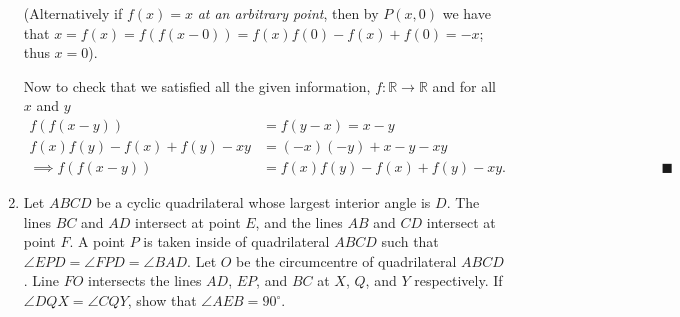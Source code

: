 \documentclass[11pt]{article}
\begin{document}
\begin{enumerate}[topsep=\bigskipamount,itemsep=\bigskipamount,leftmargin=0pt]
(Alternatively if $f(x)=x$ \emph{at an arbitrary point}, then by $P(x,0)$ we have that $x = f(x) = f(f(x-0)) = f(x)f(0) - f(x)+f(0) = -x$; thus $x=0$).

Now to check that we satisfied all the given information, $f:\mathbb{R}\to\mathbb{R}$ and for all $x$ and $y$
\begin{align*}
    f(f(x-y)) &= f(y-x) = x-y \\
    f(x)f(y) -f(x) +f(y) -xy &= (-x)(-y) + x-y-xy \\
    \implies f(f(x-y)) &= f(x)f(y) - f(x)+f(y)-xy. \mspace{200mu}\blacksquare
\end{align*}


\item %
Let $ABCD$ be a cyclic quadrilateral whose largest interior angle is $D$.
The lines $BC$ and $AD$ intersect at point $E$, and the lines $AB$ and $CD$ intersect at point $F$.
A point $P$ is taken inside of quadrilateral $ABCD$ such that $\angle EPD = \angle FPD = \angle BAD$.
Let $O$ be the circumcentre of quadrilateral $ABCD$.
Line $FO$ intersects the lines $AD$, $EP$, and $BC$ at $X$, $Q$, and $Y$ respectively.
If $\angle DQX = \angle CQY$, show that $\angle AEB = 90^\circ$.


\end{enumerate}
\end{document}
